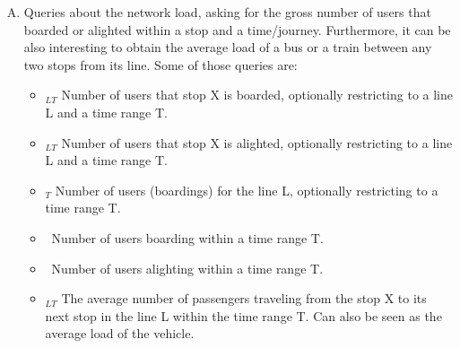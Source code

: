     \begin{enumerate}[A)]
        \item Queries about the network load, asking for the gross number of users that boarded or alighted within a stop and a time/journey. Furthermore, it can be also interesting to obtain the average load of a bus or a train between any two stops from its line. Some of those queries are:
        \begin{itemize}
            \item \boardX$_{LT}$ Number of users that stop X is boarded, optionally restricting to a line L and a time range T.
            \item \alightX$_{LT}$ Number of users that stop X is alighted, optionally restricting to a line L and a time range T.
            \item \useL$_T$  Number of users (boardings) for the line L, optionally restricting to a time range T.
            \item \boardT~Number of users boarding within a time range T.
            \item \alightT~Number of users alighting within a time range T.
            \item \loadX$_{LT}$ The average number of passengers traveling from the stop X to its next stop in the line L within the time range T. Can also be seen as the average load of the vehicle.
        \end{itemize}
        

\end{enumerate}

